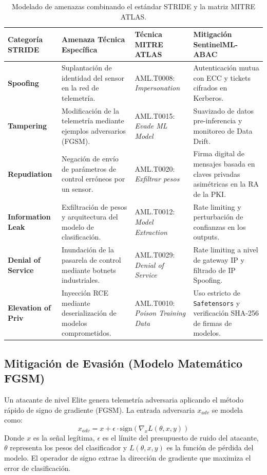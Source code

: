 \documentclass[12pt,letterpaper]{article}
\begin{document}
\begin{table}[H]
\centering
\scriptsize
\begin{tabularx}{\textwidth}{l L{4cm} L{3.5cm} L{3.5cm}}
\toprule
\textbf{Categoría STRIDE} & \textbf{Amenaza Técnica Específica} & \textbf{Técnica MITRE ATLAS} & \textbf{Mitigación SentinelML-ABAC} \\
\midrule
\textbf{Spoofing} & Suplantación de identidad del sensor en la red de telemetría. & AML.T0008: \textit{Impersonation} & Autenticación mutua con ECC y tickets cifrados en Kerberos. \\
\textbf{Tampering} & Modificación de la telemetría mediante ejemplos adversarios (FGSM). & AML.T0015: \textit{Evade ML Model} & Suavizado de datos pre-inferencia y monitoreo de Data Drift. \\
\textbf{Repudiation} & Negación de envío de parámetros de control erróneos por un sensor. & AML.T0020: \textit{Exfiltrar pesos} & Firma digital de mensajes basada en claves privadas asimétricas en la RA de la PKI. \\
\textbf{Information Leak} & Exfiltración de pesos y arquitectura del modelo de clasificación. & AML.T0012: \textit{Model Extraction} & Rate limiting y perturbación de confianzas en los outputs. \\
\textbf{Denial of Service} & Inundación de la pasarela de control mediante botnets industriales. & AML.T0029: \textit{Denial of Service} & Rate limiting a nivel de gateway IP y filtrado de IP Spoofing. \\
\textbf{Elevation of Priv} & Inyección RCE mediante deserialización de modelos comprometidos. & AML.T0010: \textit{Poison Training Data} & Uso estricto de \texttt{Safetensors} y verificación SHA-256 de firmas de modelos. \\
\bottomrule
\end{tabularx}
\caption{Modelado de amenazas combinando el estándar STRIDE y la matriz MITRE ATLAS.}
\label{tab:stride_atlas}
\end{table}

\subsection{Mitigación de Evasión (Modelo Matemático FGSM)}
Un atacante de nivel Elite genera telemetría adversaria aplicando el método rápido de signo de gradiente (FGSM). La entrada adversaria $x_{adv}$ se modela como:
\begin{equation}
    x_{adv} = x + \epsilon \cdot \text{sign}\left( \nabla_x L(\theta, x, y) \right)
\end{equation}
Donde $x$ es la señal legítima, $\epsilon$ es el límite del presupuesto de ruido del atacante, $\theta$ representa los pesos del clasificador y $L(\theta, x, y)$ es la función de pérdida del modelo. El operador de signo extrae la dirección de gradiente que maximiza el error de clasificación.
\end{document}
